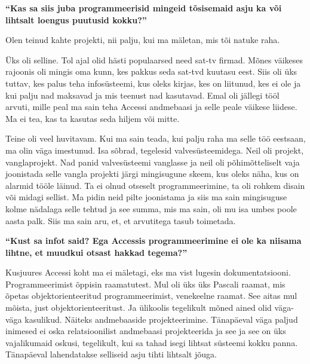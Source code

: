 \textbf{\enquote{Kas sa siis juba programmeerisid mingeid tõsisemaid asju ka või lihtsalt loengus puutusid kokku?}}

Olen teinud kahte projekti, nii palju, kui ma mäletan, mis tõi natuke raha.

Üks oli selline. Tol ajal olid hästi populaarsed need sat-tv firmad. Mõnes väikeses rajoonis oli mingis oma kunn, kes pakkus seda sat-tvd kuutasu eest. Siis oli üks tuttav, kes palus teha infosüsteemi, kus oleks kirjas, kes on liitunud, kes ei ole ja kui palju nad maksavad ja mis teenust nad kasutavad. Emal oli jällegi tööl arvuti, mille peal ma sain teha Accessi andmebaasi ja selle peale väikese liidese. Ma ei tea, kas ta kasutas seda hiljem või mitte.

Teine oli veel huvitavam. Kui ma sain teada, kui palju raha ma selle töö eestsaan, ma olin väga imestunud. Isa sõbrad, tegelesid valvesüsteemidega. Neil oli projekt, vanglaprojekt. Nad panid valvesüsteemi vanglasse ja neil oli põhimõtteliselt vaja joonistada selle vangla projekti järgi mingisugune skeem, kus oleks näha, kus on alarmid tööle läinud. Ta ei olnud otseselt programmeerimine, ta oli rohkem disain või midagi sellist. Ma pidin neid pilte joonistama ja siis ma sain mingisuguse kolme nädalaga selle tehtud ja see summa, mis ma sain, oli mu isa umbes poole aasta palk. Siis ma sain aru, et, et arvutitega tasub toimetada.

\textbf{\enquote{Kust sa infot said? Ega Accessis programmeerimine ei ole ka niisama lihtne, et muudkui otsast hakkad tegema?}}

Kusjuures Accessi koht ma ei mäletagi, eks ma vist lugesin dokumentatsiooni. Programmeerimist õppisin 
raamatutest. Mul oli üks üks Pascali raamat, mis õpetas objektorienteeritud programmeerimist, venekeelne raamat. See aitas mul mõista, just objektorienteeritust. Ja ülikoolis tegelikult mõned ained olid väga-väga kasulikud. Näiteks andmebaaside projekteerimine. Tänapäeval väga paljud inimesed ei oska relatsioonilist andmebaasi projekteerida ja see ja see on üks vajalikumaid oskusi, tegelikult, kui sa tahad isegi lihtsat süsteemi kokku panna. Tänapäeval lahendatakse selliseid asju tihti lihtsalt jõuga.

